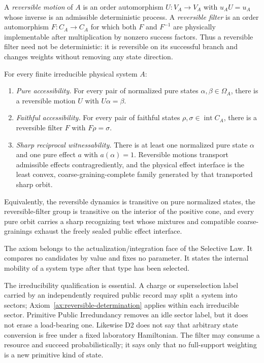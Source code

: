 \begin{definition}
A \emph{reversible motion} of $A$ is an order automorphism
$U:V_A\to V_A$ with $u_AU=u_A$ whose inverse is an admissible deterministic
process.  A \emph{reversible filter} is an order automorphism
$F:C_A\to C_A$ for which both $F$ and $F^{-1}$ are physically implementable after
multiplication by nonzero success factors.  Thus a reversible filter need not be
deterministic: it is reversible on its successful branch and changes weights without
removing any state direction.
\end{definition}

\begin{axiom}
\label{ax:reversible-determination}
For every finite irreducible physical system $A$:
\begin{enumerate}[label=\textup{D\arabic*},leftmargin=2.4em]
\item \emph{Pure accessibility.}  For every pair of normalized pure states
      $\alpha,\beta\in\Omega_A$, there is a reversible motion $U$ with
      $U\alpha=\beta$.
\item \emph{Faithful accessibility.}  For every pair of faithful states
      $\rho,\sigma\in\operatorname{int}C_A$, there is a reversible filter $F$ with
      $F\rho=\sigma$.
\item \emph{Sharp reciprocal witnessability.}  There is at least one normalized
      pure state $\alpha$ and one pure effect $a$ with $a(\alpha)=1$.  Reversible
      motions transport admissible effects contragrediently, and the physical effect
      interface is the least convex, coarse-graining-complete family generated by
      that transported sharp orbit.
\end{enumerate}
Equivalently, the reversible dynamics is transitive on pure normalized states, the
reversible-filter group is transitive on the interior of the positive cone, and
every pure orbit carries a sharp recognizing test whose mixtures and compatible
coarse-grainings exhaust the freely sealed public effect interface.
\end{axiom}

\begin{remark}
The axiom belongs to the actualization/integration face of the Selective Law.  It
compares no candidates by value and fixes no parameter.  It states the internal
mobility of a system type after that type has been selected.

The irreducibility qualification is essential.  A charge or superselection label
carried by an independently required public record may split a system into sectors;
Axiom~\ref{ax:reversible-determination} applies within each irreducible sector.
Primitive Public Irredundancy removes an idle sector label, but it does not erase a
load-bearing one.  Likewise D2 does not say that arbitrary state conversion is free
under a fixed laboratory Hamiltonian.  The filter may consume a resource and succeed
probabilistically; it says only that no full-support weighting is a new primitive
kind of state.
\end{remark}

